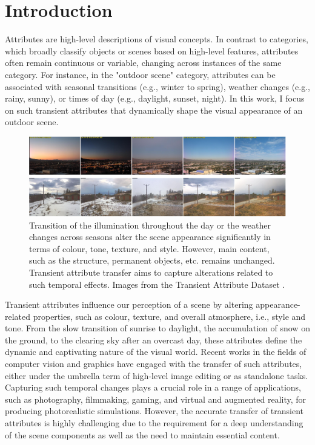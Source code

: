 \section{Introduction}\label{sec:zero-shot-intro}


Attributes are high-level descriptions of visual concepts. In contrast to categories, which broadly classify objects or scenes based on high-level features, attributes often remain continuous or variable, changing across instances of the same category. For instance, in the "outdoor scene" category, attributes can be associated with seasonal transitions (e.g., winter to spring), weather changes (e.g., rainy, sunny), or times of day (e.g., daylight, sunset, night). In this work, I focus on such transient attributes that dynamically shape the visual appearance of an outdoor scene.


\begin{figure}[ht]
  \includegraphics[width=\textwidth]{Chapters/zero-shot-tat-figs/tat-teaser.pdf}
  \caption{Transition of the illumination throughout the day or the weather changes across seasons alter the scene appearance significantly in terms of colour, tone, texture, and style. However, main content, such as the structure, permanent objects, etc. remains unchanged. Transient attribute transfer aims to capture alterations related to such temporal effects. Images from the Transient Attribute Dataset \cite{laffont2014transient}.}
  \label{fig:zero-shot-teaser}
\end{figure}

Transient attributes influence our perception of a scene by altering appearance-related properties, such as colour, texture, and overall atmosphere, i.e., style and tone. From the slow transition of sunrise to daylight, the accumulation of snow on the ground, to the clearing sky after an overcast day, these attributes define the dynamic and captivating nature of the visual world. Recent works in the fields of computer vision and graphics have engaged with the transfer of such attributes, either under the umbrella term of high-level image editing or as standalone tasks. Capturing such temporal changes plays a crucial role in a range of applications, such as photography, filmmaking, gaming, and virtual and augmented reality, for producing photorealistic simulations. However, the accurate transfer of transient attributes is highly challenging due to the requirement for a deep understanding of the scene components as well as the need to maintain essential content.

